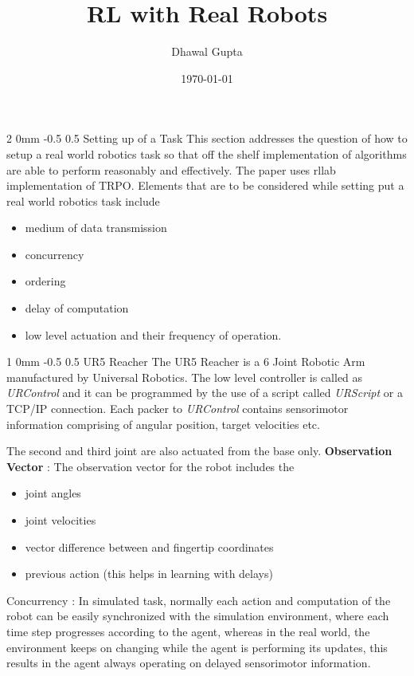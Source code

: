 \documentclass[twocolumn,11pt]{article}
\title{RL with Real Robots }
\author{Dhawal Gupta}
\date{\today}
\makeatletter
\renewcommand{\section}{\@startsection
{section}%
{2}%
{0mm}%
{-0.5\baselineskip}%
{0.5\baselineskip}%
{\bfseries\color{blue}}} %
\renewcommand{\subsection}{\@startsection
{subsection}%
{1}%
{0mm}%
{-0.5\baselineskip}%
{0.5\baselineskip}%
{\bfseries\color{blue}}} %
\makeatother
\begin{document}
\maketitle

\section{Setting up of a Task}
This section addresses the question of how to setup a real world robotics task so that off the shelf implementation of algorithms are able to perform reasonably and effectively. The paper uses rllab implementation of TRPO. Elements that are to be considered while setting put a real world robotics task include
\begin{itemize}
\itemsep0em 
\item medium of data transmission
\item concurrency
\item ordering
\item delay of computation
\item low level actuation and their frequency of operation.
\end{itemize}

\subsection{UR5 Reacher}
The UR5 Reacher is a 6 Joint Robotic Arm manufactured by Universal Robotics. The low level controller is called as \textit{URControl} and it can be programmed by the use of a script called \textit{URScript} or a TCP/IP connection. Each packer to \textit{URControl } contains sensorimotor information comprising of angular position, target velocities etc.

The second and third joint are also actuated from the base only.
\textbf{Observation  Vector} : The observation vector for the  robot includes the 
\begin{itemize}
\itemsep0em 
\item joint angles
\item  joint velocities
\item vector difference between and fingertip coordinates
\item previous action (this helps  in learning with delays)
\end{itemize} 

Concurrency : In simulated task, normally each action and computation of the robot can be easily  synchronized with the simulation environment, where each time step progresses according to the agent, whereas in the real world, the  environment keeps on changing while the agent is performing its updates, this results in  the agent always operating on delayed sensorimotor information.
\end{document}
